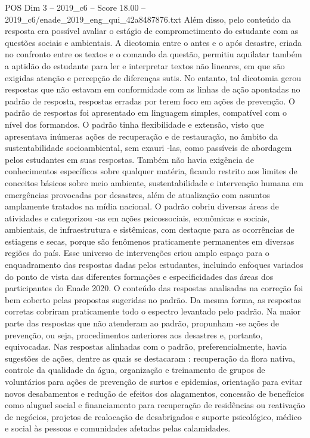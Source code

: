 \begin{textsample}{POS Dim 3 – 2019\_c6 – Score 18.00 – 2019\_c6/enade\_2019\_eng\_qui\_42a8487876.txt}
Além disso, pelo conteúdo da resposta era possível avaliar o estágio de comprometimento do estudante com as questões sociais e ambientais.
A dicotomia entre o antes e o após desastre, criada no confronto entre os textos e o comando da questão, permitiu aquilatar também a aptidão do estudante para ler e interpretar textos não lineares, em que são exigidas atenção e percepção de diferenças sutis.
No entanto, tal dicotomia gerou respostas que não estavam em conformidade com as linhas de ação apontadas no padrão de resposta, respostas erradas por terem foco em ações de prevenção.
O padrão de respostas foi apresentado em linguagem simples, compatível com o nível dos formandos.
O padrão tinha flexibilidade e extensão, visto que apresentava inúmeras ações de recuperação e de restauração, no âmbito da sustentabilidade socioambiental, sem exauri -las, como passíveis de abordagem pelos estudantes em suas respostas.
Também não havia exigência de conhecimentos específicos sobre qualquer matéria, ficando restrito aos limites de conceitos básicos sobre meio ambiente, sustentabilidade e intervenção humana em emergências provocadas por desastres, além de atualização com assuntos amplamente tratados na mídia nacional.
O padrão cobriu diversas áreas de atividades e categorizou -as em ações psicossociais, econômicas e sociais, ambientais, de infraestrutura e sistêmicas, com destaque para as ocorrências de estiagens e secas, porque são fenômenos praticamente permanentes em diversas regiões do país.
Esse universo de intervenções criou amplo espaço para o enquadramento das respostas dadas pelos estudantes, incluindo enfoques variados do ponto de vista das diferentes formações e especificidades das áreas dos participantes do Enade 2020.
O conteúdo das respostas analisadas na correção foi bem coberto pelas propostas sugeridas no padrão.
Da mesma forma, as respostas corretas cobriram praticamente todo o espectro levantado pelo padrão.
Na maior parte das respostas que não atenderam ao padrão, propunham -se ações de prevenção, ou seja, procedimentos anteriores aos desastres e, portanto, equivocadas.
Nas respostas alinhadas com o padrão, preferencialmente, havia sugestões de ações, dentre as quais se destacaram : recuperação da flora nativa, controle da qualidade da água, organização e treinamento de grupos de voluntários para ações de prevenção de surtos e epidemias, orientação para evitar novos desabamentos e redução de efeitos dos alagamentos, concessão de benefícios como aluguel social e financiamento para recuperação de residências ou reativação de negócios, projetos de realocação de desabrigados e suporte psicológico, médico e social às pessoas e comunidades afetadas pelas calamidades.

\end{textsample}

